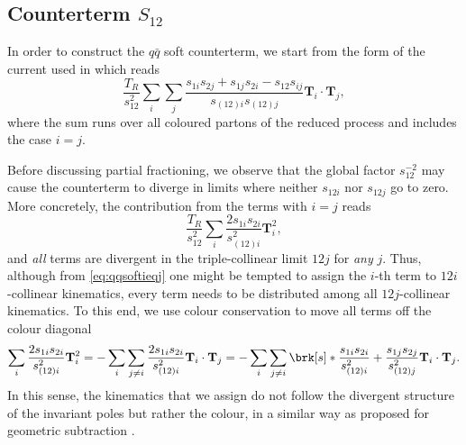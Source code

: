 \documentclass[11pt,a4paper]{article}
\newcommand{\colorT}[1]{\mathbf{T}_{#1}}
\begin{document}
\subsection{Counterterm $S_{12}$}

In order to construct the $q\bar{q}$ soft counterterm,
we start from the form of the current used in \cite{Somogyi:2005xz} which reads
\begin{equation}
	\frac{T_R}{s_{12}^2} \sum_i \sum_j
	\frac{s_{1i}s_{2j} + s_{1j}s_{2i} - s_{12}s_{ij}}{s_{(12)i} s_{(12)j}}
	\colorT{i}\cdot\colorT{j},
\end{equation}
where the sum runs over all coloured partons of the reduced process
and includes the case $i=j$.

Before discussing partial fractioning, we observe
that the global factor $s_{12}^{-2}$ may cause the counterterm to diverge
in limits where neither $s_{12i}$ nor $s_{12j}$ go to zero.
More concretely, the contribution from the terms with $i=j$ reads
\begin{equation}
\label{eq:qqsoftieqj}
	\frac{T_R}{s_{12}^2} \sum_{i}
	\frac{2s_{1i}s_{2i}}{s_{(12)i}^2}
	\colorT{i}^2,
\end{equation}
and \emph{all} terms are divergent in the triple-collinear limit $12j$
for \emph{any} $j$.
Thus, although from \cref{eq:qqsoftieqj} one might be tempted
to assign the $i$-th term to $12i$-collinear kinematics,
every term needs to be distributed among all $12j$-collinear kinematics.
To this end, we use colour conservation to move all terms off the colour diagonal
\begin{equation}
	\sum_{i}
	\frac{2s_{1i}s_{2i}}{s_{(12)i}^2}
	\colorT{i}^2
	= - \sum_i \sum_{j\ne i}
	\frac{2s_{1i}s_{2i}}{s_{(12)i}^2}
	\colorT{i}\cdot\colorT{j}
	= - \sum_i \sum_{j\ne i} \brk[s]*{
	\frac{s_{1i}s_{2i}}{s_{(12)i}^2}
	+ \frac{s_{1j}s_{2j}}{s_{(12)j}^2}
	}
	\colorT{i}\cdot\colorT{j}.
\end{equation}
In this sense, the kinematics that we assign do not follow the divergent structure
of the invariant poles but rather the colour,
in a similar way as proposed for geometric subtraction \cite{Herzog:2018ggi}.
\end{document}
